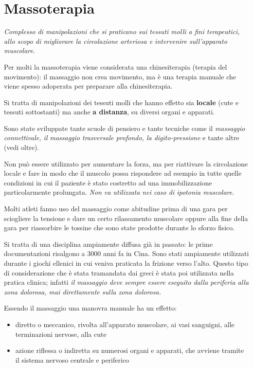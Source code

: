 
\section{Massoterapia}


\emph{Complesso di manipolazioni che si praticano sui tessuti molli a
fini terapeutici, allo scopo di migliorare la circolazione arteriosa e
intervenire sull'apparato muscolare}.

Per molti la massoterapia viene considerata una chinesiterapia (terapia
del movimento): il massaggio non crea movimento, ma è una terapia
manuale che viene spesso adoperata per preparare alla chinesiterapia.

Si tratta di manipolazioni dei tessuti molli che hanno effetto sia
\textbf{locale} (cute e tessuti sottostanti) ma anche \textbf{a
distanza}, su diversi organi e apparati.

Sono state sviluppate tante scuole di pensiero e tante tecniche come il
\emph{massaggio connettivale, il massaggio trasversale profondo, la
digito-pressione} e tante altre (vedi oltre).

Non può essere utilizzato per aumentare la forza, ma per riattivare la
circolazione locale e fare in modo che il muscolo possa rispondere ad
esempio in tutte quelle condizioni in cui il paziente è stato costretto
ad una immobilizzazione particolarmente prolungata. \emph{Non va
utilizzata nei caso di ipotonia muscolare.}

Molti atleti fanno uso del massaggio come abitudine prima di una gara
per sciogliere la tensione e dare un certo rilassamento muscolare oppure
alla fine della gara per riassorbire le tossine che sono state prodotte
durante lo sforzo fisico.

Si tratta di una disciplina ampiamente diffusa già in passato: le prime
documentazioni risalgono a 3000 anni fa in Cina. Sono stati ampiamente
utilizzati durante i giochi ellenici in cui veniva praticata la frizione
verso l'alto. Questo tipo di considerazione che è stata tramandata dai
greci è stata poi utilizzata nella pratica clinica; infatti \emph{il
massaggio deve sempre essere eseguito dalla periferia alla zona
dolorosa, mai direttamente sulla zona dolorosa.}

Essendo il massaggio una manovra manuale ha un effetto:

\begin{itemize}
\item
  diretto o meccanico, rivolta all'apparato muscolare, ai vasi
  sanguigni, alle terminazioni nervose, alla cute
\item
  azione riflessa o indiretta su numerosi organi e apparati, che avviene
  tramite il sistema nervoso centrale e periferico
\end{itemize}

